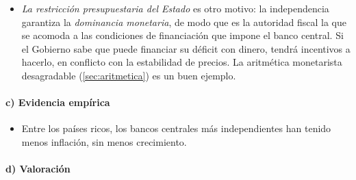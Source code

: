 \documentclass[11pt]{article}
\begin{document}
\begin{itemize}
\begin{enumerate}[label=\alph*)]
\begin{itemize}
    \item \emph{La restricción presupuestaria del Estado} es otro motivo: la independencia garantiza la \emph{dominancia monetaria}, de modo que es la autoridad fiscal la que se acomoda a las condiciones de financiación que impone el banco central. Si el Gobierno sabe que puede financiar su déficit con dinero, tendrá incentivos a hacerlo, en conflicto con la estabilidad de precios. La aritmética monetarista desagradable (\ref{sec:aritmetica}) es un buen ejemplo.
    \end{itemize}
  \end{enumerate}
\end{itemize}

\paragraph{c) Evidencia empírica}

\begin{itemize}
\item Entre los países ricos, los bancos centrales más independientes han tenido menos inflación, sin menos crecimiento\nocite{AlesinaSummers1993Central}.
\end{itemize}

\paragraph{d) Valoración}
\end{document}

